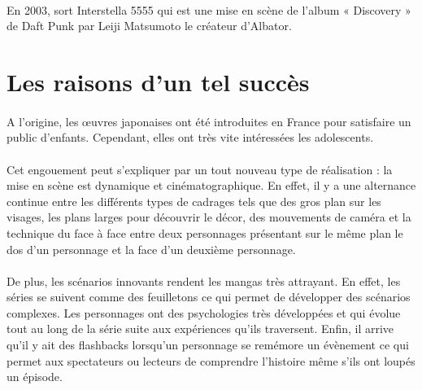 \paragraph{}
En 2003, sort Interstella 5555 qui est une mise en scène de l’album « Discovery » de Daft Punk par Leiji Matsumoto le créateur d’Albator.

\section{Les raisons d'un tel succès}
\paragraph{}
A l’origine, les œuvres japonaises ont été introduites en France pour satisfaire un public d’enfants. Cependant, elles ont très vite intéressées les adolescents. 
\paragraph{}
Cet engouement peut s’expliquer par un tout nouveau type de réalisation : la mise en scène est dynamique et cinématographique. En effet, il y a une alternance continue entre les différents types de cadrages tels que des gros plan sur les visages, les plans larges pour découvrir le décor, des mouvements de caméra et la technique du face à face entre deux personnages présentant sur le même plan le dos d’un personnage et la face d’un deuxième personnage. 
\paragraph{}
De plus, les scénarios innovants rendent les mangas très attrayant. En effet, les séries se suivent comme des feuilletons ce qui permet de développer des scénarios complexes. Les personnages ont des psychologies très développées et qui évolue tout au long de la série suite aux expériences qu’ils traversent. Enfin, il arrive qu’il y ait des flashbacks lorsqu’un personnage se remémore un évènement ce qui permet aux spectateurs ou lecteurs de comprendre l’histoire même s’ils ont loupés un épisode. 
